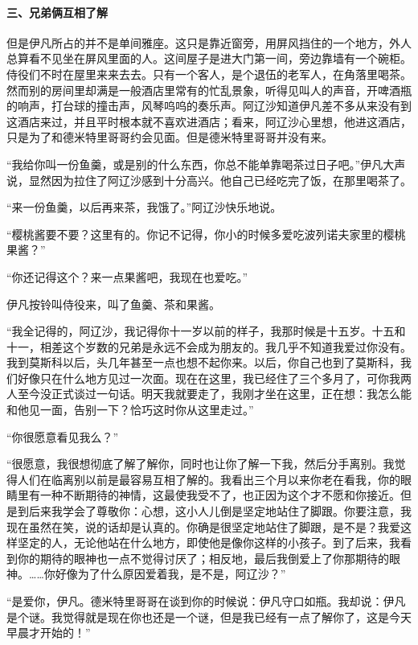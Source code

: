 \paragraph*{三、兄弟俩互相了解}
\par 但是伊凡所占的并不是单间雅座。这只是靠近窗旁，用屏风挡住的一个地方，外人总算看不见坐在屏风里面的人。这间屋子是进大门第一间，旁边靠墙有一个碗柜。侍役们不时在屋里来来去去。只有一个客人，是个退伍的老军人，在角落里喝茶。然而别的房间里却满是一般酒店里常有的忙乱景象，听得见叫人的声音，开啤酒瓶的响声，打台球的撞击声，风琴呜呜的奏乐声。阿辽沙知道伊凡差不多从来没有到这酒店来过，并且平时根本就不喜欢进酒店；看来，阿辽沙心里想，他进这酒店，只是为了和德米特里哥哥约会见面。但是德米特里哥哥并没有来。
\par “我给你叫一份鱼羹，或是别的什么东西，你总不能单靠喝茶过日子吧。”伊凡大声说，显然因为拉住了阿辽沙感到十分高兴。他自己已经吃完了饭，在那里喝茶了。
\par “来一份鱼羹，以后再来茶，我饿了。”阿辽沙快乐地说。
\par “樱桃酱要不要？这里有的。你记不记得，你小的时候多爱吃波列诺夫家里的樱桃果酱？”
\par “你还记得这个？来一点果酱吧，我现在也爱吃。”
\par 伊凡按铃叫侍役来，叫了鱼羹、茶和果酱。
\par “我全记得的，阿辽沙，我记得你十一岁以前的样子，我那时候是十五岁。十五和十一，相差这个岁数的兄弟是永远不会成为朋友的。我几乎不知道我爱过你没有。我到莫斯科以后，头几年甚至一点也想不起你来。以后，你自己也到了莫斯科，我们好像只在什么地方见过一次面。现在在这里，我已经住了三个多月了，可你我两人至今没正式谈过一句话。明天我就要走了，我刚才坐在这里，正在想：我怎么能和他见一面，告别一下？恰巧这时你从这里走过。”
\par “你很愿意看见我么？”
\par “很愿意，我很想彻底了解了解你，同时也让你了解一下我，然后分手离别。我觉得人们在临离别以前是最容易互相了解的。我看出三个月以来你老在看我，你的眼睛里有一种不断期待的神情，这最使我受不了，也正因为这个才不愿和你接近。但是到后来我学会了尊敬你：心想，这小人儿倒是坚定地站住了脚跟。你要注意，我现在虽然在笑，说的话却是认真的。你确是很坚定地站住了脚跟，是不是？我爱这样坚定的人，无论他站在什么地方，即使他是像你这样的小孩子。到了后来，我看到你的期待的眼神也一点不觉得讨厌了；相反地，最后我倒爱上了你那期待的眼神。……你好像为了什么原因爱着我，是不是，阿辽沙？”
\par “是爱你，伊凡。德米特里哥哥在谈到你的时候说：伊凡守口如瓶。我却说：伊凡是个谜。我觉得就是现在你也还是一个谜，但是我已经有一点了解你了，这是今天早晨才开始的！”
